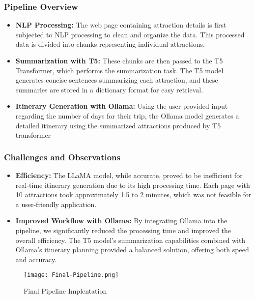 \documentclass[conference]{IEEEtran}
\begin{document}
        \subsubsection{Pipeline Overview}
            \begin{itemize}
                \item \textbf{NLP Processing:} The web page containing attraction details is first subjected to NLP processing to clean and organize the data. This processed data is divided into chunks representing individual attractions.
                \item \textbf{Summarization with T5:} These chunks are then passed to the T5 Transformer, which performs the summarization task. The T5 model generates concise sentences summarizing each attraction, and these summaries are stored in a dictionary format for easy retrieval.
                \item \textbf{Itinerary Generation with Ollama:} Using the user-provided input regarding the number of days for their trip, the Ollama model generates a detailed itinerary using the summarized attractions produced by T5 transformer
            \end{itemize}

        \subsubsection{Challenges and Observations}
            \begin{itemize}
                \item \textbf{Efficiency:} The LLaMA model, while accurate, proved to be inefficient for real-time itinerary generation due to its high processing time. Each page with 10 attractions took approximately 1.5 to 2 minutes, which was not feasible for a user-friendly application.
                \item \textbf{Improved Workflow with Ollama:} By integrating Ollama into the pipeline, we significantly reduced the processing time and improved the overall efficiency. The T5 model's summarization capabilities combined with Ollama's itinerary planning provided a balanced solution, offering both speed and accuracy.
            \end{itemize}

            \begin{figure}
                \centering
                \texttt{[image: Final-Pipeline.png]}
                \caption{Final Pipeline Implentation}
                \label{fig:final-pipeline}
            \end{figure}
\end{document}
